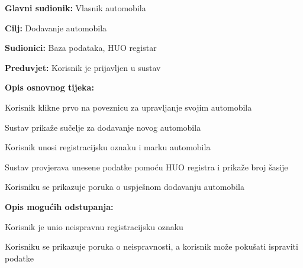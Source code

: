 \noindent {}
\begin{packed_item}
	
	\item \textbf{Glavni sudionik: } Vlasnik automobila
	\item  \textbf{Cilj:} Dodavanje automobila
	\item  \textbf{Sudionici:} Baza podataka, HUO registar
	\item  \textbf{Preduvjet:} Korisnik je prijavljen u sustav
	\item  \textbf{Opis osnovnog tijeka:}
	
	\item[] \begin{packed_enum}
		
		\item Korisnik klikne prvo na poveznicu za upravljanje svojim automobila
		\item Sustav prikaže sučelje za dodavanje novog automobila
		\item Korisnik unosi registracijsku oznaku i marku automobila
		\item Sustav provjerava unesene podatke pomoću HUO registra i prikaže
		broj šasije
		\item Korisniku se prikazuje poruka o uspješnom dodavanju automobila
		
	\end{packed_enum}
	
	\item  \textbf{Opis mogućih odstupanja:}
	
	\item[] \begin{packed_item}
		
		\item[4.a] Korisnik je unio neispravnu registracijsku oznaku
		\item[] \begin{packed_enum}
			
			\item Korisniku se prikazuje poruka o neispravnosti, a korisnik može
			pokušati ispraviti podatke
			
		\end{packed_enum}
		
	\end{packed_item}
\end{packed_item}

